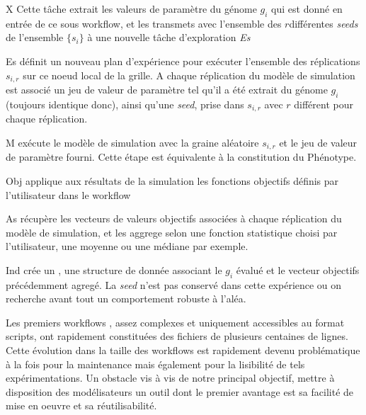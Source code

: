 \begin{myitemize}

\item[X] Cette tâche extrait les valeurs de paramètre du génome $g_i$ qui est donné en entrée de ce sous workflow, et les transmets avec l'ensemble des $r$différentes \textit{seeds} de l'ensemble $\{s_i\}$ à une nouvelle tâche d'exploration \textit{Es}

\item[Es] définit un nouveau plan d'expérience pour exécuter l'ensemble des réplications $s_{i,r}$ sur ce noeud local de la grille. A chaque réplication du modèle de simulation est associé un jeu de valeur de paramètre tel qu'il a été extrait du génome $g_i$ (toujours identique donc), ainsi qu'une \textit{seed}, prise dans $s_{i,r}$ avec $r$ différent pour chaque réplication.

\item[M] exécute le modèle de simulation avec la graine aléatoire $s_{i,r}$ et le jeu de valeur de paramètre fourni. Cette étape est équivalente à la constitution du Phénotype.

\item[Obj] applique aux résultats de la simulation les fonctions objectifs définis par l'utilisateur dans le workflow

\item[As] récupère les vecteurs de valeurs objectifs associées à chaque réplication du modèle de simulation, et les aggrege selon une fonction statistique choisi par l'utilisateur, une moyenne ou une médiane par exemple.

\item[Ind] crée un , une structure de donnée associant le  $g_i$ évalué et le vecteur objectifs précédemment agregé. La \textit{seed} n'est pas conservé dans cette expérience ou on recherche avant tout un comportement robuste à l'aléa.

\end{myitemize}

Les premiers workflows , assez complexes et uniquement accessibles au format scripts, ont rapidement constituées des fichiers de plusieurs centaines de lignes. Cette évolution dans la taille des workflows est rapidement devenu problématique à la fois pour la maintenance mais également pour la lisibilité de tels expérimentations. Un obstacle vis à vis de notre principal objectif, mettre à disposition des modélisateurs un outil dont le premier avantage est sa facilité de mise en oeuvre et sa réutilisabilité.

